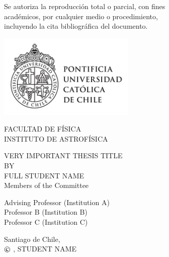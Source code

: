 \documentclass[12pt]{mythesis}
\makeatletter
\newcommand\Romanyear{\@Roman{\year}}
\makeatother
\begin{document}
\begin{center}
\vspace*{0.25\textheight}
Se autoriza la reproducci\'{o}n total o parcial, con fines\\ 
acad\'{e}micos, por cualquier medio o procedimiento,\\ 
incluyendo la cita bibliogr\'{a}fica del documento.
\vspace*{\fill}
\end{center}
\newpage
\makeatletter\@twosidefalse\makeatother
{}

\pagestyle{empty}
\vspace*{-40.0mm}%
\hspace*{-10mm}%
        \parbox{80pt}
{\centering %
            \includegraphics*[width=65mm]{./figures/UC_lineal_TR-01.png}\\[.2\normalbaselineskip]   
        }
\begin{flushright}
\vspace*{-9.0mm}
FACULTAD DE F\'{I}SICA\\
INSTITUTO DE ASTROF\'{I}SICA
\end{flushright}
\begin{center}
\huge{VERY IMPORTANT THESIS TITLE}\\
\vspace{1.5cm}
\normalsize
BY\\
\Large{FULL STUDENT NAME}\\
\vspace{1.5cm}
\vspace{1.cm}
\normalsize Members of the Committee\\
\vspace{.5cm}
\parbox{250pt}{
\large{Advising Professor \hfill (Institution A)\\
Professor B \hfill (Institution B)\\
Professor C \hfill (Institution C)\\}}
\vfill
\normalsize
Santiago de Chile, \monthname\, \the\year\\
\vspace{1.cm}
$\copyright$ \Romanyear, STUDENT NAME
\end{center}
\newpage
\end{document}
